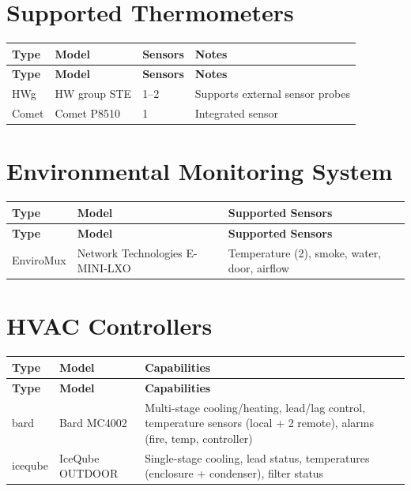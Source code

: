 \section{Supported Thermometers}

\begin{longtable}{p{2.5cm}p{3.5cm}p{2cm}p{6cm}}
    \toprule
    \textbf{Type} & \textbf{Model} & \textbf{Sensors} & \textbf{Notes} \\
    \midrule
    \endfirsthead
    \toprule
    \textbf{Type} & \textbf{Model} & \textbf{Sensors} & \textbf{Notes} \\
    \midrule
    \endhead
    \bottomrule
    \endfoot

    HWg & HW group STE & 1--2 & Supports external sensor probes \\
    Comet & Comet P8510 & 1 & Integrated sensor \\

\end{longtable}

\section{Environmental Monitoring System}

\begin{longtable}{p{3cm}p{4cm}p{7cm}}
    \toprule
    \textbf{Type} & \textbf{Model} & \textbf{Supported Sensors} \\
    \midrule
    \endfirsthead
    \toprule
    \textbf{Type} & \textbf{Model} & \textbf{Supported Sensors} \\
    \midrule
    \endhead
    \bottomrule
    \endfoot

    EnviroMux & Network Technologies E-MINI-LXO & Temperature (2), smoke, water, door, airflow \\

\end{longtable}

\section{HVAC Controllers}

\begin{longtable}{p{2.5cm}p{3cm}p{8.5cm}}
    \toprule
    \textbf{Type} & \textbf{Model} & \textbf{Capabilities} \\
    \midrule
    \endfirsthead
    \toprule
    \textbf{Type} & \textbf{Model} & \textbf{Capabilities} \\
    \midrule
    \endhead
    \bottomrule
    \endfoot

    bard & Bard MC4002 & Multi-stage cooling/heating, lead/lag control, temperature sensors (local + 2 remote), alarms (fire, temp, controller) \\
    iceqube & IceQube OUTDOOR & Single-stage cooling, lead status, temperatures (enclosure + condenser), filter status \\

\end{longtable}

